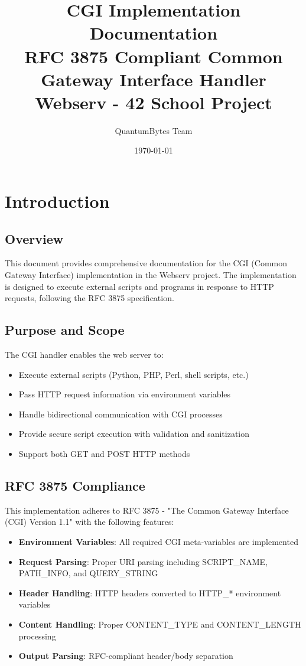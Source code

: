 \documentclass[11pt,a4paper]{article}
\title{\textbf{CGI Implementation Documentation}\\
\large RFC 3875 Compliant Common Gateway Interface Handler\\
\vspace{0.5cm}
\normalsize Webserv - 42 School Project}
\author{QuantumBytes Team}
\date{\today}
\begin{document}
\maketitle
\newpage

\tableofcontents
\newpage

\section{Introduction}

\subsection{Overview}

This document provides comprehensive documentation for the CGI (Common Gateway Interface) implementation in the Webserv project. The implementation is designed to execute external scripts and programs in response to HTTP requests, following the RFC 3875 specification.

\subsection{Purpose and Scope}

The CGI handler enables the web server to:

\begin{itemize}
    \item Execute external scripts (Python, PHP, Perl, shell scripts, etc.)
    \item Pass HTTP request information via environment variables
    \item Handle bidirectional communication with CGI processes
    \item Provide secure script execution with validation and sanitization
    \item Support both GET and POST HTTP methods
\end{itemize}

\subsection{RFC 3875 Compliance}

This implementation adheres to RFC 3875 - "The Common Gateway Interface (CGI) Version 1.1" with the following features:

\begin{itemize}
    \item \textbf{Environment Variables}: All required CGI meta-variables are implemented
    \item \textbf{Request Parsing}: Proper URI parsing including SCRIPT\_NAME, PATH\_INFO, and QUERY\_STRING
    \item \textbf{Header Handling}: HTTP headers converted to HTTP\_* environment variables
    \item \textbf{Content Handling}: Proper CONTENT\_TYPE and CONTENT\_LENGTH processing
    \item \textbf{Output Parsing}: RFC-compliant header/body separation
\end{itemize}
\end{document}
